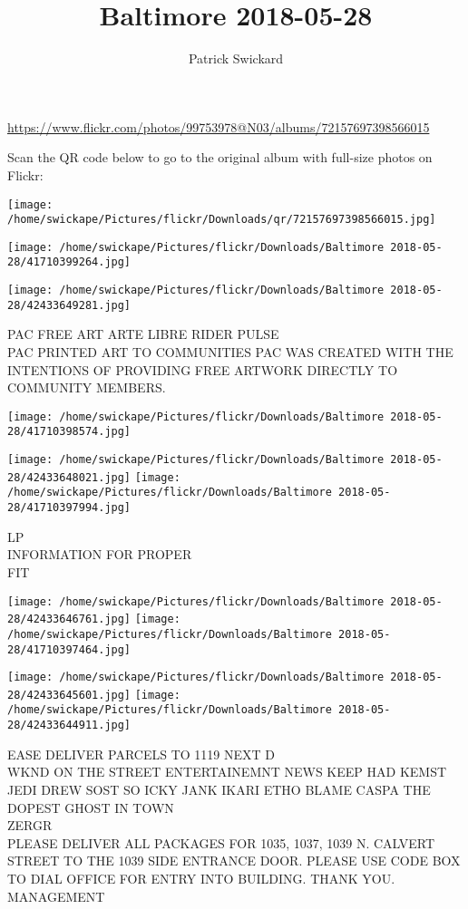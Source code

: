 \documentclass[10pt,letterpaper]{article}
\title{Baltimore 2018-05-28}
\author{Patrick Swickard}
\date{}
\begin{document}
\maketitle

\url{https://www.flickr.com/photos/99753978@N03/albums/72157697398566015}

Scan the QR code below to go to the original album with full-size photos on Flickr:

\texttt{[image: /home/swickape/Pictures/flickr/Downloads/qr/72157697398566015.jpg]}
\pagebreak

\texttt{[image: /home/swickape/Pictures/flickr/Downloads/Baltimore 2018-05-28/41710399264.jpg]}

\vspace{0.25in}
\texttt{[image: /home/swickape/Pictures/flickr/Downloads/Baltimore 2018-05-28/42433649281.jpg]}

PAC FREE ART ARTE LIBRE RIDER PULSE\\
PAC PRINTED ART TO COMMUNITIES PAC WAS CREATED WITH THE INTENTIONS OF PROVIDING FREE ARTWORK DIRECTLY TO COMMUNITY MEMBERS.
\pagebreak

\texttt{[image: /home/swickape/Pictures/flickr/Downloads/Baltimore 2018-05-28/41710398574.jpg]}

\vspace{0.25in}
\texttt{[image: /home/swickape/Pictures/flickr/Downloads/Baltimore 2018-05-28/42433648021.jpg]}
\texttt{[image: /home/swickape/Pictures/flickr/Downloads/Baltimore 2018-05-28/41710397994.jpg]}

LP\\
INFORMATION FOR PROPER\\
FIT
\pagebreak

\texttt{[image: /home/swickape/Pictures/flickr/Downloads/Baltimore 2018-05-28/42433646761.jpg]}
\texttt{[image: /home/swickape/Pictures/flickr/Downloads/Baltimore 2018-05-28/41710397464.jpg]}

\texttt{[image: /home/swickape/Pictures/flickr/Downloads/Baltimore 2018-05-28/42433645601.jpg]}
\texttt{[image: /home/swickape/Pictures/flickr/Downloads/Baltimore 2018-05-28/42433644911.jpg]}

EASE DELIVER PARCELS TO 1119 NEXT D\\
WKND ON THE STREET ENTERTAINEMNT NEWS KEEP HAD KEMST JEDI DREW SOST SO ICKY JANK IKARI ETHO BLAME CASPA THE DOPEST GHOST IN TOWN\\
ZERGR\\
PLEASE DELIVER ALL PACKAGES FOR 1035, 1037, 1039 N. CALVERT STREET TO THE 1039 SIDE ENTRANCE DOOR.  PLEASE USE CODE BOX TO DIAL OFFICE FOR ENTRY INTO BUILDING.  THANK YOU.  MANAGEMENT
\pagebreak
\end{document}
